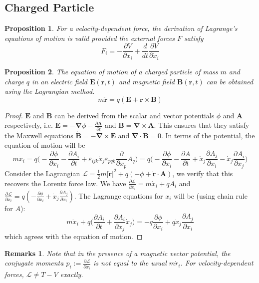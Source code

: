 \documentclass[a4paper]{article}
\newtheorem{remarks}{Remarks}[section]
\theoremstyle{new}
\newtheorem{prop}{Proposition}[section]
\begin{document}
\subsection{Charged Particle}
\begin{prop}
For a velocity-dependent force, the derivation of Lagrange's equations of motion is valid provided the external forces $F$ satisfy
$$F_i=-\frac{\partial V}{\partial x_i}+\frac{d}{dt}\frac{\partial V}{\partial\dot{x}_i}$$
\end{prop}
\begin{prop}
The equation of motion of a charged particle of mass $m$ and charge $q$ in an electric field $\mathbf{E}(\mathbf{r},t)$ and magnetic field $\mathbf{B}(\mathbf{r},t)$ can be obtained using the Lagrangian method.
$$m\mathbf{\ddot{r}}=q(\mathbf{E}+\mathbf{\dot{r}}\times\mathbf{B})$$
\end{prop}
\begin{proof}
$\mathbf{E}$ and $\mathbf{B}$ can be derived from the scalar and vector potentials $\phi$ and $\mathbf{A}$ respectively, i.e. $\mathbf{E}=-\boldsymbol{\nabla}\phi-\frac{\partial\mathbf{A}}{\partial t}$ and $\mathbf{B}=\boldsymbol{\nabla}\times\mathbf{A}$. This ensures that they satisfy the Maxwell equations $\mathbf{\dot{B}}=-\boldsymbol{\nabla}\times\mathbf{E}$ and $\boldsymbol{\nabla}\cdot\mathbf{B}=0$. In terms of the potential, the equation of motion will be
$$m\ddot{x}_i=q\bigg(-\frac{\partial\phi}{\partial x_i}-\frac{\partial A_i}{\partial t}+\varepsilon_{ijk}\dot{x}_j\varepsilon_{pqk}\frac{\partial}{\partial x_p}A_q\bigg)=q\bigg(-\frac{\partial\phi}{\partial x_i}-\frac{\partial A}{\partial t}+\dot{x}_j\frac{\partial A_j}{\partial x_i}-\dot{x}_j\frac{\partial A_i}{\partial x_j}\bigg)$$
Consider the Lagrangian $\mathcal{L}=\frac{1}{2}m|\mathbf{\dot{r}}|^2+q(-\phi+\mathbf{\dot{r}}\cdot\mathbf{A})$, we verify that this recovers the Lorentz force law. We have $\frac{\partial\mathcal{L}}{\partial\dot{x}_i}=m\dot{x}_i+qA_i$ and $\frac{\partial\mathcal{L}}{\partial x_i}=q(-\frac{\partial\phi}{\partial x_i}+\dot{x}_j\frac{\partial A_j}{\partial x_i})$. The Lagrange equations for $x_i$ will be (using chain rule for $A$):
$$m\ddot{x}_i+q\bigg(\frac{\partial A_i}{\partial t}+\frac{\partial A_i}{\partial x_j}\dot{x}_j\bigg)=-q\frac{\partial\phi}{\partial x_i}+q\dot{x}_j\frac{\partial A_j}{\partial x_i}$$
which agrees with the equation of motion.
\end{proof}
\begin{remarks}
Note that in the presence of a magnetic vector potential, the conjugate momenta $p_i:=\frac{\partial\mathcal{L}}{\partial\dot{x}_i}$ is not equal to the usual $m\dot{r}_i$. For velocity-dependent forces, $\mathcal{L}\neq T-V$ exactly.
\end{remarks}
\end{document}
